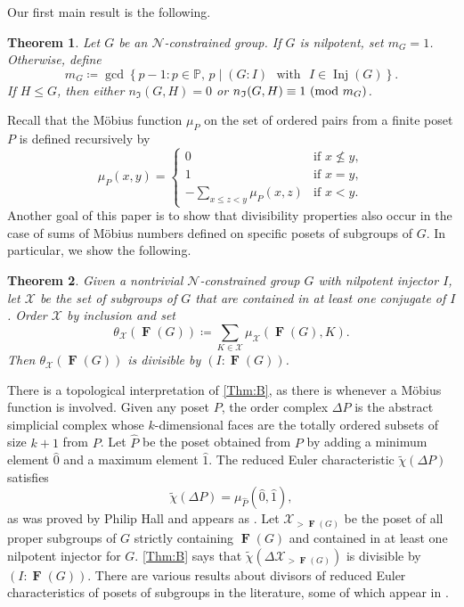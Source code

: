 \documentclass[a4paper,12pt,reqno]{amsart}
\newtheorem{prevtheorem}{Theorem}
\numberwithin{equation}{section}
\DeclareMathOperator{\fitt}{\mathbf{F}}
\DeclareMathOperator{\inj}{Inj}
\renewcommand{\leq}{\leqslant}
\newcommand{\md}[1]{\,\left(\textnormal{mod}\ #1\right)}
\begin{document}
Our first main result is the following.

\begin{prevtheorem} \label{Thm:A}
Let $G$ be an ${\mathcal N}$-constrained group. If $G$ is nilpotent, set $m_G=1$.  Otherwise, define
\begin{equation}
m_G \coloneqq \gcd\left\{ p - 1 : p\in\mathbb{P},\, p \mid (G : I) \,\,\text{ with }\,\, I \in \inj(G) \right\}.
\end{equation}
If $H \leq G$, then either $n_\mathfrak{I}(G,H)=0$ or $n_\mathfrak{I}(G,H) \equiv 1\md{m_G}$.
\end{prevtheorem}


Recall that the M\"obius function $\mu_P$ on the set of ordered pairs from a finite poset $P$ is defined recursively by
\[
\mu_P(x,y)= \left\{ \begin{array}{lll} 
0                            & \mbox{if } x \not \leq y,\\ 
1                            & \mbox{if } x = y,        \\ 
-\sum_{x \leq z<y}\mu_P(x,z) & \mbox{if } x < y .
\end{array} \right.
\]
Another goal of this paper is to show that divisibility properties also occur in the case of sums of M\"obius numbers defined on specific posets of subgroups of $G$.  In particular, we show the following.

\begin{prevtheorem}\label{Thm:B}
Given a nontrivial ${\mathcal N}$-constrained group $G$ with nilpotent injector $I$, 
let $\mathcal{X}$ be the set of subgroups of $G$ that are contained in at least one conjugate of $I$.  
Order $\mathcal{X}$ by inclusion and set
\[
\theta_\mathcal{X}(\fitt(G)) \coloneqq
\sum_{K \in \mathcal{X}}\mu_\mathcal{X}(\fitt(G),K).
\]
Then $\theta_\mathcal{X}(\fitt(G))$ is divisible by $(I : \fitt(G))$.
\end{prevtheorem}

  
There is a topological interpretation of \autoref{Thm:B}, 
as there is whenever a M\"obius function is involved. 
Given any poset $P$, 
the order complex $\Delta P$ is the abstract simplicial complex 
whose $k$-dimensional faces are the totally ordered subsets of size $k+1$ from $P$.  
Let $\hat{P}$ be the poset obtained from $P$ 
by adding a minimum element $\hat{0}$ and a maximum element $\hat{1}$.  
The reduced Euler characteristic $\tilde{\chi}(\Delta P)$ satisfies
\[
\tilde{\chi}(\Delta P) = \mu_{\hat{P}}(\hat{0}, \hat{1}),
\]
as was proved by Philip Hall and appears as \cite[Thm.~3.8.5]{StanleyEC1}.  
Let $\mathcal{X}_{>\fitt(G)}$ be the poset of all proper subgroups of $G$ 
strictly containing $\fitt(G)$ and contained in at least one nilpotent injector for $G$.  
\autoref{Thm:B} says that $\tilde{\chi}(\Delta\mathcal{X}_{>\fitt(G)})$ is divisible by $(I : \fitt(G))$.  There are various results about divisors of reduced Euler characteristics of posets of subgroups in the literature, some of which appear in \cite[Sections 5.3 and 5.4]{Smith}.
\end{document}
